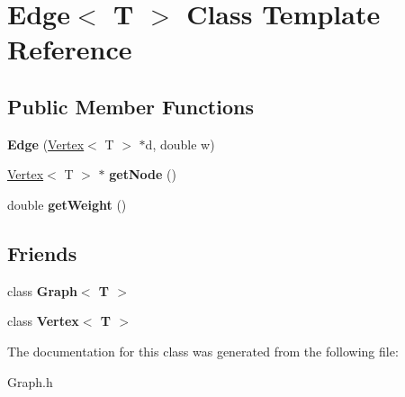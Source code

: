 \hypertarget{class_edge}{}\section{Edge$<$ T $>$ Class Template Reference}
\label{class_edge}
\subsection*{Public Member Functions}
\begin{DoxyCompactItemize}
\item 
\mbox{\label{class_edge_a9da861a03f920c89984be33515a5d870}} 
{\bfseries Edge} (\hyperlink{class_vertex}{Vertex}$<$ T $>$ $\ast$d, double w)
\item 
\mbox{\label{class_edge_a8ee03ac80c1dc675ff3d344fee451b8a}} 
\hyperlink{class_vertex}{Vertex}$<$ T $>$ $\ast$ {\bfseries get\+Node} ()
\item 
\mbox{\label{class_edge_a5203c0721c87e9c035ad62c796a1725e}} 
double {\bfseries get\+Weight} ()
\end{DoxyCompactItemize}
\subsection*{Friends}
\begin{DoxyCompactItemize}
\item 
\mbox{\label{class_edge_aefa9b76cd57411c5354e5620dc2d84dd}} 
class {\bfseries Graph$<$ T $>$}
\item 
\mbox{\label{class_edge_a2e120a12dec663fa334633b4f26cbed8}} 
class {\bfseries Vertex$<$ T $>$}
\end{DoxyCompactItemize}


The documentation for this class was generated from the following file\+:\begin{DoxyCompactItemize}
\item 
Graph.\+h\end{DoxyCompactItemize}
